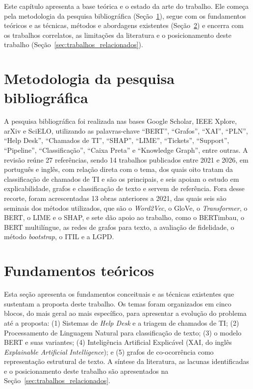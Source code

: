 \documentclass[
    12pt,                %
    openright,           %
    oneside,             %
    a4paper,             %
    english,             %
    brazil               %
]{abntex2}
\begin{document}
Este capítulo apresenta a base teórica e o estado da arte do trabalho. Ele começa pela metodologia da pesquisa bibliográfica (Seção~\ref{sec:metodologia_pesquisa_bib}), segue com os fundamentos teóricos e as técnicas, métodos e abordagens existentes (Seção~\ref{sec:fundamentos}) e encerra com os trabalhos correlatos, as limitações da literatura e o posicionamento deste trabalho (Seção~\ref{sec:trabalhos_relacionados}).

\section{Metodologia da pesquisa bibliográfica}
\label{sec:metodologia_pesquisa_bib}

A pesquisa bibliográfica foi realizada nas bases Google Scholar, IEEE Xplore, arXiv e SciELO, utilizando as palavras-chave ``BERT'', ``Grafos'', ``XAI'', ``PLN'', ``Help Desk'', ``Chamados de TI'', ``SHAP'', ``LIME'', ``Tickets'', ``Support'', ``Pipeline'', ``Classificação'', ``Caixa Preta'' e ``Knowledge Graph'', entre outras. A revisão reúne 27 referências, sendo 14 trabalhos publicados entre 2021 e 2026, em português e inglês, com relação direta com o tema, dos quais oito tratam da classificação de chamados de TI e são os principais, e seis apoiam o estudo em explicabilidade, grafos e classificação de texto e servem de referência. Fora desse recorte, foram acrescentadas 13 obras anteriores a 2021, das quais seis são seminais dos métodos utilizados, que são o \textit{Word2Vec}, o GloVe, o \textit{Transformer}, o BERT, o LIME e o SHAP, e sete dão apoio ao trabalho, como o BERTimbau, o BERT multilíngue, as redes de grafos para texto, a avaliação de fidelidade, o método \textit{bootstrap}, o ITIL e a LGPD.

\section{Fundamentos teóricos}
\label{sec:fundamentos}

Esta seção apresenta os fundamentos conceituais e as técnicas existentes que sustentam a proposta deste trabalho. Os temas foram organizados em cinco blocos, do mais geral ao mais específico, para apresentar a evolução do problema até a proposta: (1) Sistemas de \textit{Help Desk} e a triagem de chamados de TI; (2) Processamento de Linguagem Natural para classificação de texto; (3) o modelo BERT e suas variantes; (4) Inteligência Artificial Explicável (XAI, do inglês \textit{Explainable Artificial Intelligence}); e (5) grafos de co-ocorrência como representação estrutural de texto. A síntese da literatura, as lacunas identificadas e o posicionamento deste trabalho são apresentados na Seção~\ref{sec:trabalhos_relacionados}.
\end{document}
